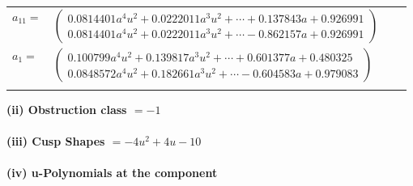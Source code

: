 \documentclass[1p]{elsarticle_modified}
\theoremstyle{definition}
\begin{document}
\begin{tabular}{m{7pt} m{180pt} m{7pt} m{180pt} }
\flushright $a_{11}=$&$\begin{pmatrix}0.0814401 a^{4} u^{2}+0.0222011 a^{3} u^{2}+\cdots+0.137843 a+0.926991\\0.0814401 a^{4} u^{2}+0.0222011 a^{3} u^{2}+\cdots-0.862157 a+0.926991\end{pmatrix}$ \\
\flushright $a_{1}=$&$\begin{pmatrix}0.100799 a^{4} u^{2}+0.139817 a^{3} u^{2}+\cdots+0.601377 a+0.480325\\0.0848572 a^{4} u^{2}+0.182661 a^{3} u^{2}+\cdots-0.604583 a+0.979083\end{pmatrix}$\\&\end{tabular}
\flushleft \textbf{(ii) Obstruction class $= -1$}\\~\\
\flushleft \textbf{(iii) Cusp Shapes $= -4 u^2+4 u-10$}\\~\\
\newpage\renewcommand{\arraystretch}{1}
\flushleft \textbf{(iv) u-Polynomials at the component}\newline \\
\end{document}
